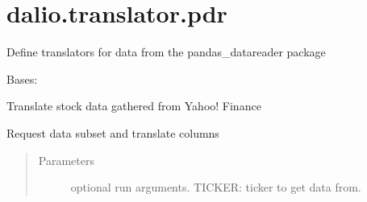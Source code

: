 \documentclass[letterpaper,10pt,english]{sphinxmanual}
\begin{document}
\section{dalio.translator.pdr}
\label{\detokenize{dalio.translator:module-dalio.translator.pdr}}\label{\detokenize{dalio.translator:dalio-translator-pdr}}
Define translators for data from the pandas\_datareader package

\begin{fulllineitems}
\label{\detokenize{dalio.translator:dalio.translator.pdr.YahooStockTranslator}}
Bases: {\hyperref[\detokenize{dalio.translator:dalio.translator.translator.Translator}]{}}

Translate stock data gathered from Yahoo! Finance

\begin{fulllineitems}
\label{\detokenize{dalio.translator:dalio.translator.pdr.YahooStockTranslator.run}}
Request data subset and translate columns
\begin{quote}\begin{description}
\item[{Parameters}] \leavevmode
{} \textendash{} optional run arguments.
TICKER: ticker to get data from.

\end{description}\end{quote}

\end{fulllineitems}


\begin{fulllineitems}
\label{\detokenize{dalio.translator:dalio.translator.pdr.YahooStockTranslator.translations}}
\end{fulllineitems}


\end{fulllineitems}
\end{document}
